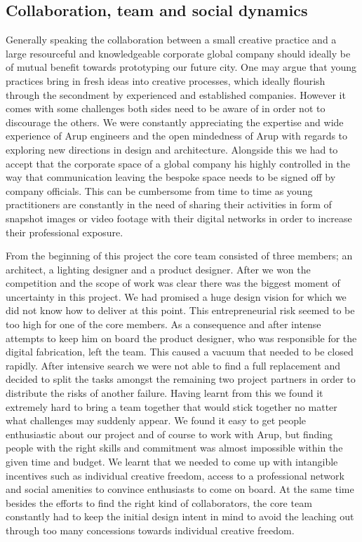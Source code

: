 \subsection*{Collaboration, team and social dynamics}

Generally speaking the collaboration between a small creative practice and a large resourceful and knowledgeable corporate global company should ideally be of mutual benefit towards prototyping our future city. One may argue that young practices bring in fresh ideas into creative processes, which ideally flourish through the secondment by experienced and established companies. However it comes with some challenges both sides need to be aware of in order not to discourage the others. We were constantly appreciating the expertise and wide experience of Arup engineers and the open mindedness of Arup with regards to exploring new directions in design and architecture. Alongside this we had to accept that the corporate space of a global company his highly controlled in the way that communication leaving the bespoke space needs to be signed off by company officials. This can be cumbersome from time to time as young practitioners are constantly in the need of sharing their activities in form of snapshot images or video footage with their digital networks in order to increase their professional exposure.   

From the beginning of this project the core team consisted of three members; an architect, a lighting designer and a product designer. After we won the competition and the scope of work was clear there was the biggest moment of uncertainty in this project. We had promised a huge design vision for which we did not know how to deliver at this point. This entrepreneurial risk seemed to be too high for one of the core members. As a consequence and after intense attempts to keep him on board the product designer, who was responsible for the digital fabrication, left the team. This caused a vacuum that needed to be closed rapidly. After intensive search we were not able to find a full replacement and decided to split the tasks amongst the remaining two project partners in order to distribute the risks of another failure. Having learnt from this we found it extremely hard to bring a team together that would stick together no matter what challenges may suddenly appear. We found it easy to get people enthusiastic about our project and of course to work with Arup, but finding people with the right skills and commitment was almost impossible within the given time and budget. We learnt that we needed to come up with intangible incentives such as individual creative freedom, access to a professional network and social amenities to convince enthusiasts to come on board. At the same time besides the efforts to find the right kind of collaborators, the core team constantly had to keep the initial design intent in mind to avoid the leaching out through too many concessions towards individual creative freedom. 

